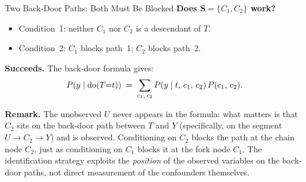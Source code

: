 \documentclass[master.tex]{subfiles}
\begin{document}
\begin{example}{Two Back-Door Paths: Both Must Be Blocked}
\medskip
\noindent\textbf{Does $\mathbf{S} = \{C_1, C_2\}$ work?}
\begin{itemize}
  \item Condition~1: neither $C_1$ nor $C_2$ is a descendant of $T$. \checkmark
  \item Condition~2: $C_1$ blocks path~1; $C_2$ blocks path~2. \checkmark
\end{itemize}
\textbf{Succeeds.}  The back-door formula gives:
\[
  P(y \mid \mathrm{do}(T{=}t))
  \;=\; \sum_{c_1,\,c_2} P(y \mid t,\,c_1,\,c_2)\,P(c_1,\,c_2).
\]

\medskip
\noindent\textbf{Remark.}
The unobserved $U$ never appears in the formula: what matters is
that $C_2$ sits on the back-door path between $T$ and $Y$ (specifically,
on the segment $U \to C_2 \to Y$) and is observed.  Conditioning on $C_2$
blocks the path at the chain node $C_2$, just as conditioning on $C_1$
blocks it at the fork node $C_1$.  The identification strategy exploits
the \emph{position} of the observed variables on the back-door paths, not
direct measurement of the confounders themselves.
\end{example}
\end{document}
